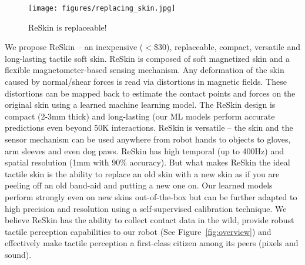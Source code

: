 \documentclass{article}
\begin{document}
\begin{wrapfigure}{r}{0.4\textwidth}
  \begin{center}
    \texttt{[image: figures/replacing\_skin.jpg]}
  \end{center}
  \caption{ReSkin is replaceable!}
\end{wrapfigure}
We propose ReSkin -- an inexpensive ($<$\$30), replaceable, compact, versatile and long-lasting tactile soft skin. ReSkin is composed of soft magnetized skin and a flexible magnetometer-based sensing mechanism. Any deformation of the skin caused by normal/shear forces is read via distortions in magnetic fields. These distortions can be mapped back to estimate the contact points and forces on the original skin using a learned machine learning model. The ReSkin design is compact (2-3mm thick) and long-lasting (our ML models perform accurate predictions even beyond 50K interactions. ReSkin is versatile -- the skin and the sensor mechanism can be used anywhere from robot hands to objects to gloves, arm sleeves and even dog paws. ReSkin has high temporal (up to 400Hz) and spatial resolution (1mm with 90\% accuracy). But what makes ReSkin the ideal tactile skin is the ability to replace an old skin with a new skin as if you are peeling off an old band-aid and putting a new one on. Our learned models perform strongly even on new skins out-of-the-box but can be further adapted to high precision and resolution using a self-supervised calibration technique. We believe ReSkin has the ability to collect contact data in the wild, provide robust tactile perception capabilities to our robot (See Figure~\ref{fig:overview}) and effectively make tactile perception a first-class citizen among its peers (pixels and sound). 






\end{document}
